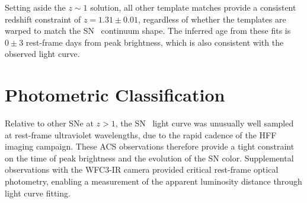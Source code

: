 Setting aside the $z\sim1$ solution, all other template matches
provide a consistent redshift constraint of $z=1.31\pm0.01$,
regardless of whether the templates are warped to match the SN \tomas\
continuum shape.  The inferred age from these fits is $0\pm3$
rest-frame days from peak brightness, which is also consistent with
the observed light curve.


\section{Photometric Classification}
\label{sec:PhotometricClassification}

Relative to other SNe at $z>1$, the SN \tomas\ light curve was
unusually well sampled at rest-frame ultraviolet wavelengths, due to
the rapid cadence of the HFF imaging campaign. These ACS observations
therefore provide a tight constraint on the time of peak brightness
and the evolution of the SN color.  Supplemental observations with the
WFC3-IR camera provided critical rest-frame optical photometry,
enabling a measurement of the apparent luminosity distance through
light curve fitting.

